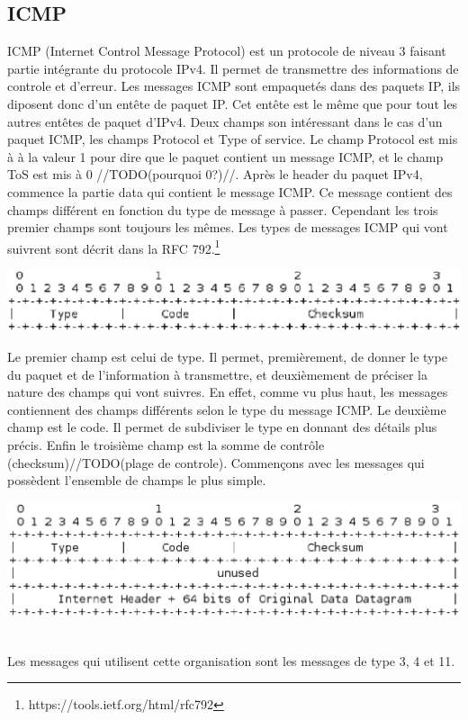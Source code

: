 \subsection{ICMP} ICMP (Internet Control Message Protocol) est un protocole de
niveau 3 faisant partie intégrante du protocole IPv4. Il permet de transmettre
des informations de controle et d'erreur. Les messages ICMP sont empaquetés
dans des paquets IP, ils diposent donc d'un entête de paquet IP. Cet entête est
le même que pour tout les autres entêtes de paquet d'IPv4. Deux champs son
intéressant dans le cas d'un paquet ICMP, les champs Protocol et Type of
service. Le champ Protocol est mis à à la valeur 1 pour dire que le paquet
contient un message ICMP, et le champ ToS est mis à 0 //TODO(pourquoi 0?)//.
Après le header du paquet IPv4, commence la partie data qui contient le message
ICMP. Ce message contient des champs différent en fonction du type de message à
passer. Cependant les trois premier champs sont toujours les mêmes.  Les types
de messages ICMP qui vont suivrent sont décrit dans la RFC
792.\footnote{https://tools.ietf.org/html/rfc792}

\includegraphics[width=15cm]{./pics/header.eps}

Le premier champ est celui de type. Il permet, premièrement, de donner le type
du paquet et de l'information à transmettre, et deuxièmement de préciser la
nature des champs qui vont suivres. En effet, comme vu plus haut, les messages
contiennent des champs différents selon le type du message ICMP.
Le deuxième champ est le code. Il permet de subdiviser le type en donnant des détails plus
précis. Enfin le troisième champ est la somme de contrôle
(checksum)//TODO(plage de controle).  Commençons avec les messages qui
possèdent l'ensemble de champs le plus simple.

\includegraphics[width=15cm]{./pics/header1.eps}

\\Les messages qui utilisent cette organisation sont les messages de type 3, 4
et 11.

